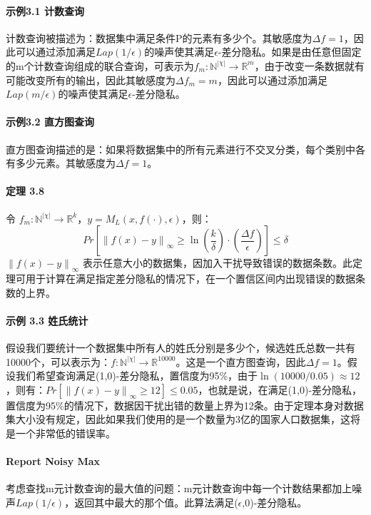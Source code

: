 \documentclass[12pt,a4paper]{article}
\begin{document}
\paragraph{示例3.1 计数查询} 计数查询被描述为：数据集中满足条件P的元素有多少个。其敏感度为$\Delta f = 1$，因此可以通过添加满足$Lap(1/\epsilon)$的噪声使其满足$\epsilon$-差分隐私。如果是由任意但固定的m个计数查询组成的联合查询，可表示为$f_m:\mathbb{N}^{|\chi|} \rightarrow \mathbb{R}^m$，由于改变一条数据就有可能改变所有的输出，因此其敏感度为$\Delta f_m = m$，因此可以通过添加满足$Lap(m/\epsilon)$的噪声使其满足$\epsilon$-差分隐私。
\paragraph{示例3.2 直方图查询} 直方图查询描述的是：如果将数据集中的所有元素进行不交叉分类，每个类别中各有多少元素。其敏感度为$\Delta f = 1$。
\paragraph{定理 3.8} 令 $f_m:\mathbb{N}^{|\chi|} \rightarrow \mathbb{R}^k$，$y=M_L(x, f(\cdot), \epsilon )$，则：
\begin{equation}
	Pr[\left \| f(x)-y \right \|_\infty \geq \ln(\frac{k}{\delta})\cdot (\frac{\Delta f}{\epsilon})] \leq \delta
\end{equation}
$\left \| f(x)-y \right \|_\infty$ 表示任意大小的数据集，因加入干扰导致错误的数据条数。此定理可用于计算在满足指定差分隐私的情况下，在一个置信区间内出现错误的数据条数的上界。
\paragraph{示例 3.3 姓氏统计} 假设我们要统计一个数据集中所有人的姓氏分别是多少个，候选姓氏总数一共有10000个，可以表示为：$f:\mathbb{N}^{|\chi|} \rightarrow \mathbb{R}^10000$。这是一个直方图查询，因此$\Delta f=1$。假设我们希望查询满足(1,0)-差分隐私，置信度为95\%，由于$\ln(10000/0.05) \approx 12$，则有：$Pr[\left \| f(x)-y \right \|_\infty \geq 12] \leq 0.05$，也就是说，在满足(1,0)-差分隐私，置信度为95\%的情况下，数据因干扰出错的数量上界为12条。由于定理本身对数据集大小没有规定，因此如果我们使用的是一个数量为3亿的国家人口数据集，这将是一个非常低的错误率。
\paragraph{Report Noisy Max} 考虑查找m元计数查询的最大值的问题：m元计数查询中每一个计数结果都加上噪声$Lap(1/\epsilon)$，返回其中最大的那个值。此算法满足($\epsilon$,0)-差分隐私。
\end{document}
